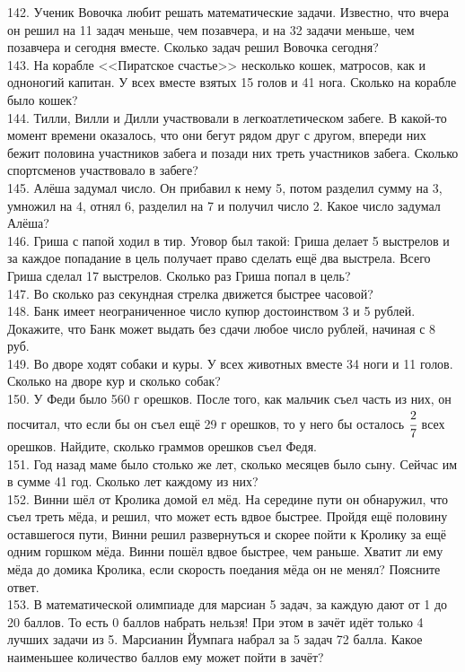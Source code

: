 \documentclass[12pt]{article}
\begin{document}
142. Ученик Вовочка любит решать математические задачи. Известно, что вчера он решил на 11 задач меньше, чем позавчера, и на 32 задачи меньше, чем позавчера и сегодня вместе. Сколько задач решил Вовочка сегодня?\\
143. На корабле <<Пиратское счастье>> несколько кошек, матросов, как и одноногий капитан. У всех вместе взятых 15 голов и 41 нога. Сколько на корабле было кошек?\\
144. Тилли, Вилли и Дилли участвовали в легкоатлетическом забеге. В какой-то момент времени оказалось, что они бегут рядом друг с другом, впереди них бежит половина участников забега и позади них треть участников забега. Сколько спортсменов участвовало в забеге?\\
145. Алёша задумал число. Он прибавил к нему 5, потом разделил сумму на 3, умножил на 4, отнял 6, разделил на 7 и получил число 2. Какое число задумал Алёша?\\
146. Гриша с папой ходил в тир. Уговор был такой: Гриша делает 5 выстрелов и за каждое попадание в цель получает право сделать ещё два выстрела. Всего Гриша сделал 17 выстрелов. Сколько раз Гриша попал в цель?\\
147. Во сколько раз секундная стрелка движется быстрее часовой?\\
148. Банк имеет неограниченное число купюр достоинством 3 и 5 рублей.  Докажите, что Банк может выдать без сдачи любое число рублей, начиная с 8 руб.\\
149. Во дворе ходят собаки и куры. У всех животных вместе 34 ноги и 11 голов. Сколько на дворе кур и сколько собак?\\
150. У Феди было 560 г орешков. После того, как мальчик съел часть из них, он посчитал, что если бы он съел ещё 29 г орешков, то у него бы осталось $\cfrac{2}{7}$ всех орешков. Найдите, сколько граммов орешков съел Федя.\\
151. Год назад маме было столько же лет, сколько месяцев было сыну. Сейчас им в сумме 41 год. Сколько лет каждому из них?\\
152. Винни шёл от Кролика домой  ел мёд. На середине пути он обнаружил, что съел треть мёда, и решил, что может есть вдвое быстрее. Пройдя ещё половину оставшегося пути, Винни решил развернуться и скорее пойти к Кролику за ещё одним горшком мёда. Винни пошёл вдвое быстрее, чем раньше. Хватит ли ему мёда до домика Кролика, если скорость поедания мёда он не менял? Поясните ответ.\\
153. В математической олимпиаде для марсиан 5 задач, за каждую дают от 1 до 20 баллов. То есть 0 баллов набрать нельзя! При этом в зачёт идёт только 4 лучших задачи из 5. Марсианин Йумпага набрал за 5 задач 72 балла. Какое наименьшее количество баллов ему может пойти в зачёт?\\
\end{document}
